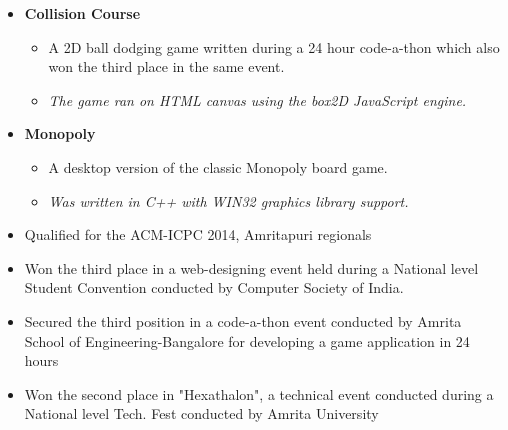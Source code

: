 \documentclass[letterpaper,11pt]{article}
\newcommand{\resitem}[1]{\item #1 \vspace{-2pt}}
\newcommand{\resheading}[1]{\textbf{\sffamily{\mbox{~}{\large #1} \vphantom{p\^{E}}}}}
\begin{document}
\begin{itemize}
\item[]
	\textbf{Collision Course}
	\vspace{-3mm}
	\begin{itemize}
		\resitem{A 2D ball dodging game written during a 24 hour code-a-thon which also won the third place in the same event.}
		\resitem{\textit{The game ran on HTML canvas using the box2D JavaScript engine.}}
	\end{itemize}

\item[]
	\textbf{Monopoly}
	\vspace{-3mm}
	\begin{itemize}
		\resitem{A desktop version of the classic Monopoly board game.}
		\resitem{\textit{Was written in C++ with WIN32 graphics library support.}}
	\end{itemize}

\end{itemize}

\resheading{Achievements}
\vspace{-3mm}
	\begin{itemize}
		\item Qualified for the ACM-ICPC 2014, Amritapuri regionals
		\vspace{-3mm}
		\item Won the third place in a web-designing event held during a National level Student Convention conducted by Computer Society of India.
		\vspace{-3mm}
		\item Secured the third position in a code-a-thon event conducted by Amrita School of Engineering-Bangalore for developing a game application in 24 hours
		\vspace{-3mm}
		\item Won the second place in "Hexathalon", a technical event conducted during a National level Tech. Fest conducted by Amrita University
    \end{itemize}
\end{document}
